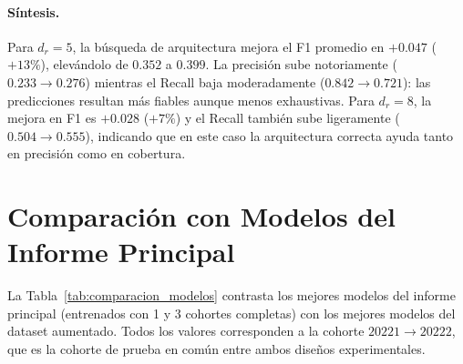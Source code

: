 \documentclass[11pt,a4paper]{article}
\begin{document}
\paragraph{Síntesis.}
Para $d_r=5$, la búsqueda de arquitectura mejora el F1 promedio en
$+0.047$ ($+13\%$), elevándolo de $0.352$ a $0.399$. La precisión sube notoriamente
($0.233 \to 0.276$) mientras el Recall baja moderadamente ($0.842 \to 0.721$): las
predicciones resultan más fiables aunque menos exhaustivas.
Para $d_r=8$, la mejora en F1 es $+0.028$ ($+7\%$) y el Recall también sube ligeramente
($0.504 \to 0.555$), indicando que en este caso la arquitectura correcta ayuda tanto
en precisión como en cobertura.

\section{Comparación con Modelos del Informe Principal}

La Tabla~\ref{tab:comparacion_modelos} contrasta los mejores modelos del informe principal
(entrenados con 1 y 3 cohortes completas) con los mejores modelos del dataset aumentado.
Todos los valores corresponden a la cohorte $20221 \to 20222$, que es la cohorte de prueba
en común entre ambos diseños experimentales.
\end{document}

